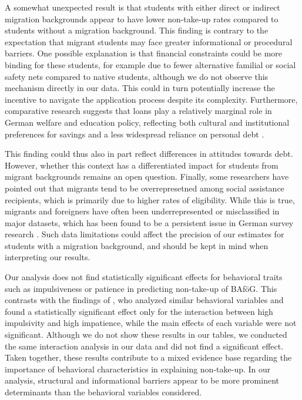 A somewhat unexpected result is that students with either direct or indirect migration backgrounds appear to have lower non-take-up rates compared to students without a migration background. This finding is contrary to the expectation that migrant students may face greater informational or procedural barriers. One possible explanation is that financial constraints could be more binding for these students, for example due to fewer alternative familial or social safety nets compared to native students, although we do not observe this mechanism directly in our data. This could in turn potentially increase the incentive to navigate the application process despite its complexity. Furthermore, comparative research suggests that loans play a relatively marginal role in German welfare and education policy, reflecting both cultural and institutional preferences for savings and a less widespread reliance on personal debt \citep{seabrooke_germany_2017}. 

This finding could thus also in part reflect differences in attitudes towards debt. However, whether this context has a differentiated impact for students from migrant backgrounds remains an open question. Finally, some researchers have pointed out that migrants tend to be overrepresetned among social assistance recipients, which is primarily due to higher rates of eligibility. While this is true, migrants and foreigners have often been underrepresented or misclassified in major datasets, which has been found to be a persistent issue in German survey research \citep{frick_claim_2007, liebaut_surveying_2016}. Such data limitations could affect the precision of our estimates for students with a migration background, and should be kept in mind when interpreting our results.


Our analysis does not find statistically significant effects for behavioral traits such as impulsiveness or patience in predicting non-take-up of BAföG. This contrasts with the findings of \cite{herber_non-take-up_2019}, who analyzed similar behavioral variables and found a statistically significant effect only for the interaction between high impulsivity and high impatience, while the main effects of each variable were not significant. Although we do not show these results in our tables, we conducted the same interaction analysis in our data and did not find a significant effect. Taken together, these results contribute to a mixed evidence base regarding the importance of behavioral characteristics in explaining non-take-up. In our analysis, structural and informational barriers appear to be more prominent determinants than the behavioral variables considered.

